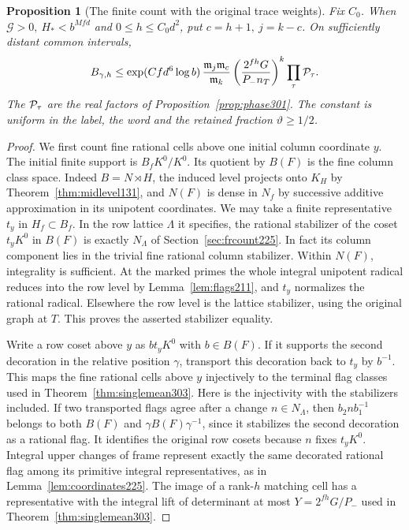 \documentclass[a4paper,11pt]{article}
\newtheorem{proposition}{Proposition}[section]
\theoremstyle{definition}
\theoremstyle{remark}
\numberwithin{equation}{section}
\begin{document}
\begin{proposition}[The finite count with the original trace weights]\leavevmode
\label{prop:flagtrace304}
Fix \(C_0\). When \(\mathcal G>0,\ H_*<b^{Mfd}\) and
\(0\le h\le C_0d^2\), put \(c=h+1,\ j=k-c\). On
sufficiently distant common intervals,
\[
 B_{\gamma,h}\le
   \exp(Cfd^6\log b)\,
   \frac{\mathfrak m_j\mathfrak m_c}{\mathfrak m_k}
   \left(\frac{2^{fh}G}{P_-n_T}\right)^k
   \prod_\tau{\cal P}_\tau .
\]
The \({\cal P}_\tau\) are the real factors of
Proposition~\ref{prop:phase301}. The constant is uniform
in the label, the word and the retained fraction
\(\vartheta\ge1/2\).
\end{proposition}
\begin{proof}
We first count fine rational cells above one initial
column coordinate \(y\). The initial finite support is
\(B_f K^0/K^0\). Its quotient by \(B(F)\) is the fine
column class space. Indeed \(B=N\rtimes H\), the
induced level projects onto \(K_H\) by
Theorem~\ref{thm:midlevel131}, and \(N(F)\) is dense
in \(N_f\) by successive additive approximation in its
unipotent coordinates. We may take a finite representative
\(t_y\) in \(H_f\subset B_f\). In the row lattice
\(\Lambda\) it specifies, the rational stabilizer of
the coset \(t_y K^0\) in \(B(F)\) is exactly
\(N_\Lambda\) of Section~\ref{sec:frcount225}.
In fact its column component lies in the trivial fine
rational column stabilizer. Within \(N(F)\), integrality
is sufficient. At the marked primes the whole integral
unipotent radical reduces into the row level by
Lemma~\ref{lem:flags211}, and \(t_y\) normalizes the
rational radical. Elsewhere the row level is the lattice
stabilizer, using the original graph at \(T\). This proves
the asserted stabilizer equality.

Write a row coset above \(y\) as \(b t_y K^0\) with
\(b\in B(F)\). If it supports the second decoration in
the relative position \(\gamma\), transport this decoration
back to \(t_y\) by \(b^{-1}\). This maps the fine rational
cells above \(y\) injectively to the terminal flag classes
used in Theorem~\ref{thm:singlemean303}. Here is the
injectivity with the stabilizers included. If two transported
flags agree after a change \(n\in N_\Lambda\), then
\(b_2 n b_1^{-1}\) belongs to both \(B(F)\) and
\(\gamma B(F)\gamma^{-1}\), since it stabilizes the
second decoration as a rational flag. It identifies the
original row cosets because \(n\) fixes \(t_y K^0\).
Integral upper changes of frame represent exactly the
same decorated rational flag among its primitive integral
representatives, as in Lemma~\ref{lem:coordinates225}.
The image of a rank-\(h\) matching cell has a representative
with the integral lift of determinant at most
\(Y=2^{fh}G/P_-\) used in Theorem~\ref{thm:singlemean303}.


\end{proof}
\end{document}
